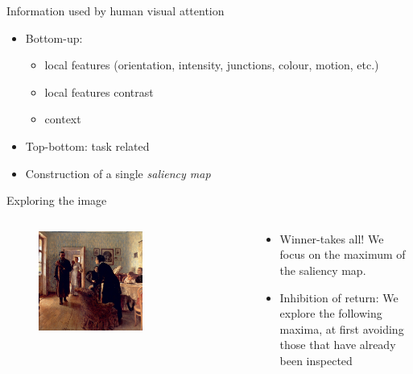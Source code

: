 \documentclass[xcolor=pdftex,dvipsnames,table,mathserif]{beamer}
\begin{document}
\begin{frame}{Information used by human visual attention}

  \begin{itemize}
  \item Bottom-up:
    \begin{itemize}
    \item local features (orientation, intensity, junctions, colour, motion, etc.)
    \item local features contrast
    \item context
    \end{itemize}
\item Top-bottom: task related
\item Construction of a single \textit{saliency map}

  \end{itemize}

\end{frame}


\begin{frame}{Exploring the image}


\begin{columns}
  \begin{column}{.5\textwidth}
    \begin{figure}[ht]
      \centering
      \includegraphics[width=0.6\textwidth]{repin_unexpected_visitor}
    \end{figure}
  \end{column}

  \begin{column}{.5\textwidth}

    \begin{itemize}
  \item Winner-takes all! We focus on the maximum of the saliency map.
  \item Inhibition of return: We explore the following maxima, at first avoiding those that have already been inspected
  \end{itemize}

  \end{column}
\end{columns}


\end{frame}
\end{document}
